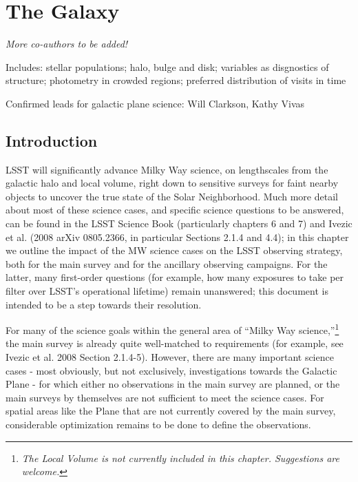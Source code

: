 \chapter[The Galaxy]{The Galaxy}
\def\chpname{galaxy}\label{chp:\chpname}

 {\it More co-authors to be added!}

Includes: stellar populations; halo, bulge and disk; variables as
disgnostics of structure; photometry in crowded regions; preferred
distribution of visits in time

Confirmed leads for galactic plane science: Will Clarkson, Kathy Vivas

\navigationbar

\section{Introduction}\label{Galaxy_Intro}

LSST will significantly advance Milky Way science, on lengthscales
from the galactic halo and local volume, right down to sensitive
surveys for faint nearby objects to uncover the true state of the
Solar Neighborhood.
Much more detail about most of these science cases, and specific
science questions to be answered, can be found in the LSST Science
Book (particularly chapters 6 and 7) and Ivezic et al. (2008 arXiv
0805.2366, in particular Sections 2.1.4 and 4.4); in this chapter we
outline the impact of the MW science cases on the LSST observing
strategy, both for the main survey and for the ancillary observing
campaigns. For the latter, many first-order questions (for example, how
many exposures to take per filter over LSST’s operational lifetime)
remain unanswered; this document is intended to be a step towards
their resolution.

For many of the science goals within the general area of “Milky Way
science,”\footnote{{\it The Local Volume is not currently included in this chapter. Suggestions are welcome.}} the main survey is already quite well-matched to
requirements (for example, see Ivezic et al. 2008 Section
2.1.4-5). However, there are many important science cases - most
obviously, but not exclusively, investigations towards the Galactic
Plane - for which either no observations in the main survey are
planned, or the main surveys by themselves are not sufficient to meet
the science cases. For spatial areas like the Plane that are not
currently covered by the main survey, considerable optimization
remains to be done to define the observations.

